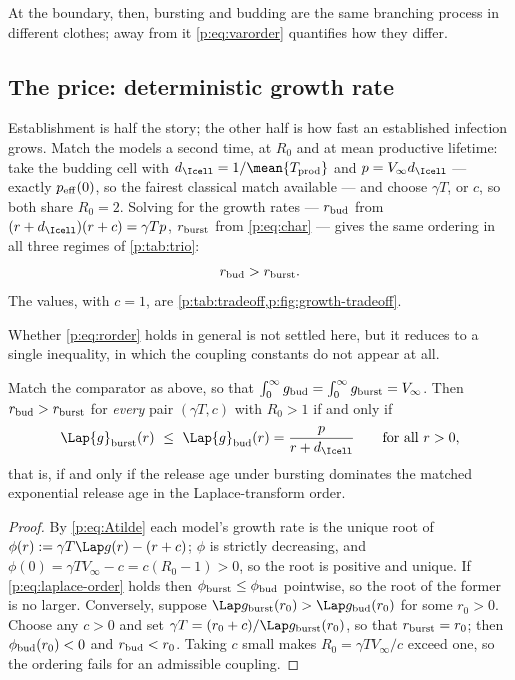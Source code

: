 At the boundary, then, bursting and budding are the same branching process
in different clothes; away from it \cref{p:eq:varorder} quantifies how they
differ.

\subsection{The price: deterministic growth rate}
\label{p:sec:tradeoff}

Establishment is half the story; the other half is how fast an established
infection grows. Match the models a second time, at $R_0$ and at mean
productive lifetime: take the budding cell with
$d_{\Icell}=1/\mean{T_{\rm prod}}$ and $p=V_\infty d_{\Icell}$ --- exactly
$p_{\rm eff}(0)$, so the fairest classical match available --- and choose
$\gamma T$, or $c$, so both share $R_0=2$. Solving for the growth rates ---
$r_{\rm bud}$ from $(r+d_{\Icell})(r+c)=\gamma Tp$, $r_{\rm burst}$ from
\cref{p:eq:char} --- gives the same ordering in all three regimes of
\cref{p:tab:trio}:
\begin{equation}
r_{\rm bud}>r_{\rm burst}.
\label{p:eq:rorder}
\end{equation}
The values, with $c=1$, are \cref{p:tab:tradeoff,p:fig:growth-tradeoff}.

Whether \cref{p:eq:rorder} holds in general is not settled here, but it
reduces to a single inequality, in which the coupling constants do not
appear at all.

\begin{proposition}
\label{p:prop:rorder}
Match the comparator as above, so that
$\int_0^\infty g_{\rm bud}=\int_0^\infty g_{\rm burst}=V_\infty$. Then
$r_{\rm bud}>r_{\rm burst}$ for \emph{every} pair $(\gamma T,c)$ with
$R_0>1$ if and only if
\begin{equation}
\Lap{g}_{\rm burst}(r)\ \le\ \Lap{g}_{\rm bud}(r)=\frac{p}{r+d_{\Icell}}
\qquad\text{for all }r>0,
\label{p:eq:laplace-order}
\end{equation}
that is, if and only if the release age under bursting dominates the matched
exponential release age in the Laplace-transform order.
\end{proposition}

\begin{proof}
By \cref{p:eq:Atilde} each model's growth rate is the unique root of
$\phi(r):=\gamma T\Lap g(r)-(r+c)$; $\phi$ is strictly decreasing, and
$\phi(0)=\gamma TV_\infty-c=c(R_0-1)>0$, so the root is positive and unique.
If \cref{p:eq:laplace-order} holds then $\phi_{\rm burst}\le\phi_{\rm bud}$
pointwise, so the root of the former is no larger. Conversely, suppose
$\Lap g_{\rm burst}(r_0)>\Lap g_{\rm bud}(r_0)$ for some $r_0>0$. Choose any
$c>0$ and set $\gamma T=(r_0+c)/\Lap g_{\rm burst}(r_0)$, so that
$r_{\rm burst}=r_0$; then $\phi_{\rm bud}(r_0)<0$ and $r_{\rm bud}<r_0$.
Taking $c$ small makes $R_0=\gamma TV_\infty/c$ exceed one, so the ordering
fails for an admissible coupling.
\end{proof}

